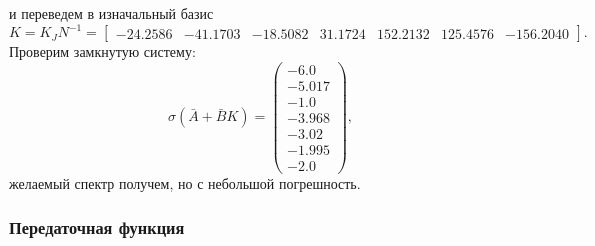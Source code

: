 и переведем в изначальный базис
\begin{equation*}
    K=K_JN^{-1}=\begin{bmatrix}
        -24.2586&	-41.1703&	-18.5082&	31.1724	&152.2132	&125.4576&	-156.2040
    \end{bmatrix}.
\end{equation*}
Проверим замкнутую систему:
\begin{equation*}
    \sigma(\bar A+\bar B K)=\left(\begin{array}{c}
-6.0\\
-5.017\\
-1.0\\
-3.968\\
-3.02\\
-1.995\\
-2.0
\end{array}\right),
\end{equation*}
желаемый спектр получем, но с небольшой погрешность.

\subsubsection{Передаточная функция}

